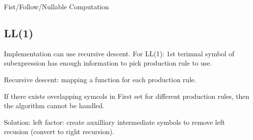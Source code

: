 \documentclass[8pt]{extarticle}
\begin{document}
\begin{multicols*}{2}
  \begin{algorithm}[H]
    \While{true}{
      \For{$(x \rightarrow y_0\ y_1\ y_2\ y_n)\ in\ productions$}{
        \uIf{$(\forall i \in [0..n])\ null[y_i]$}{
          $null[x] \leftarrow true$
        }
        \uIf{$(\forall i \in [0..k))\ null[y_i]) \wedge\ !null[y_k]$}{
          $first[x] \leftarrow first[x] \cup first[y_k]$
        }
        \For{$k \in [0..n]$} {
          \uIf{$(\forall i \in [k+1..n])\ null[y_i]$} {
            $follow[y_k] \leftarrow follow[y_k] \cup follow[x]$
          }
        }
        \For{$k\ \in [0..n]$} {
          \uIf{$(\forall i \in [k+1..j)\ null[y_i]\ \wedge\ !null[y_j]$} {
            $follow[y_k] \leftarrow follow[y_k] \cup first[y_j]$
          }
        }
      }
      \uIf{$no\ change\ in\ first/follow/null\ set$}{
        break
      }
    }
    \caption{Fist/Follow/Nullable Computation\label{Algo_FistFollowNullable}}
  \end{algorithm}

  \vfill\null
  \columnbreak
  
  \subsection{LL(1)}
  Implementation can use recursive descent. For LL(1): 1st terimnal symbol of subexpression has enough information to pick production rule to use.

  Recursive descent: mapping a function for each production rule.

  If there exists overlapping symcols in First set for different production rules, then the algorithm cannot be handled.

  Solution: left factor: create auxilliary intermediate symbols to remove left recusion (convert to right recursion).


\end{multicols*}
\end{document}
